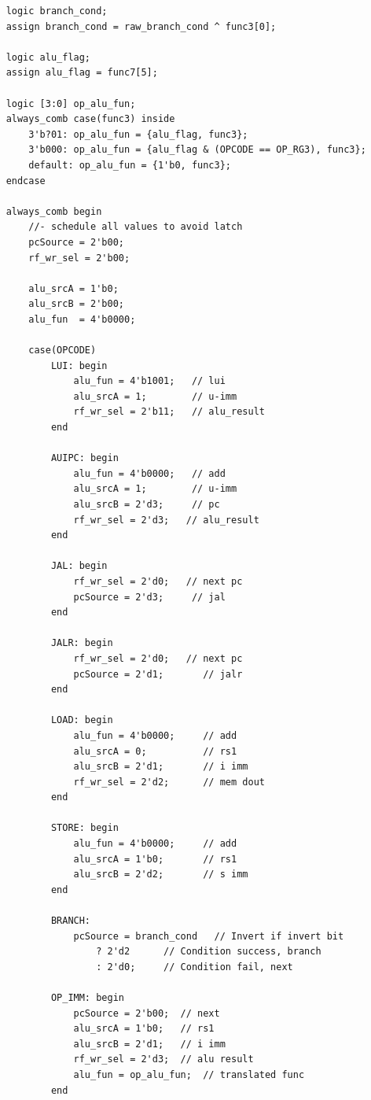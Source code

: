 \documentclass{article}
\begin{document}
\begin{verbatim}
    logic branch_cond;
    assign branch_cond = raw_branch_cond ^ func3[0];
    
    logic alu_flag;
    assign alu_flag = func7[5];
    
    logic [3:0] op_alu_fun;
    always_comb case(func3) inside
        3'b?01: op_alu_fun = {alu_flag, func3};
        3'b000: op_alu_fun = {alu_flag & (OPCODE == OP_RG3), func3};
        default: op_alu_fun = {1'b0, func3};
    endcase
       
    always_comb begin 
        //- schedule all values to avoid latch
        pcSource = 2'b00;  
        rf_wr_sel = 2'b00; 
        
        alu_srcA = 1'b0;   
        alu_srcB = 2'b00;    
        alu_fun  = 4'b0000;
        
        case(OPCODE)
            LUI: begin
                alu_fun = 4'b1001;   // lui
                alu_srcA = 1;        // u-imm 
                rf_wr_sel = 2'b11;   // alu_result
            end
            
            AUIPC: begin
                alu_fun = 4'b0000;   // add
                alu_srcA = 1;        // u-imm
                alu_srcB = 2'd3;     // pc
                rf_wr_sel = 2'd3;   // alu_result
            end
            
            JAL: begin
                rf_wr_sel = 2'd0;   // next pc
                pcSource = 2'd3;     // jal
            end
            
            JALR: begin
                rf_wr_sel = 2'd0;   // next pc
                pcSource = 2'd1;       // jalr
            end
            
            LOAD: begin
                alu_fun = 4'b0000;     // add
                alu_srcA = 0;          // rs1
                alu_srcB = 2'd1;       // i imm
                rf_wr_sel = 2'd2;      // mem dout
            end
            
            STORE: begin
                alu_fun = 4'b0000;     // add
                alu_srcA = 1'b0;       // rs1
                alu_srcB = 2'd2;       // s imm
            end
            
            BRANCH: 
                pcSource = branch_cond   // Invert if invert bit 
                    ? 2'd2      // Condition success, branch
                    : 2'd0;     // Condition fail, next
            
            OP_IMM: begin
                pcSource = 2'b00;  // next
                alu_srcA = 1'b0;   // rs1
                alu_srcB = 2'd1;   // i imm
                rf_wr_sel = 2'd3;  // alu result
                alu_fun = op_alu_fun;  // translated func
            end
            

\end{verbatim}
\end{document}
